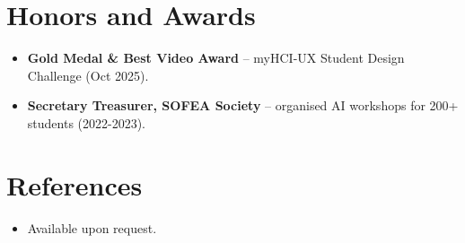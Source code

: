 \documentclass[11pt,a4paper,sans]{moderncv}
\begin{document}

\section{Honors and Awards}
\vspace{1pt}
\begin{itemize}
\item{\textbf{Gold Medal \& Best Video Award} -- myHCI-UX Student Design Challenge (Oct 2025).}
\item{\textbf{Secretary Treasurer, SOFEA Society} -- organised AI workshops for 200+ students (2022-2023).}
\end{itemize}


\section{References}
\vspace{1pt}
\begin{itemize}
\item{Available upon request.}
\end{itemize}
\end{document}

